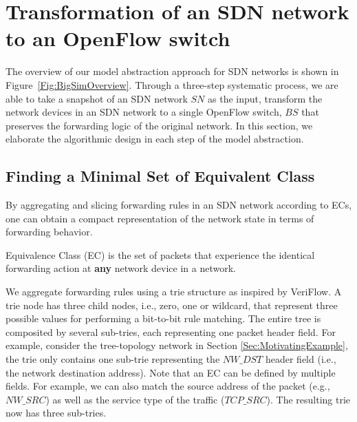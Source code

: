 \section{Transformation of an SDN network to an OpenFlow switch}
\label{Sec:Design}

The overview of our model abstraction approach for SDN networks is shown in Figure~\ref{Fig:BigSimOverview}. Through a three-step systematic process, we are able to take 
a snapshot of an SDN network $SN$ as the input, transform the network devices in an SDN network to a single OpenFlow switch, $BS$ that preserves the forwarding logic of the original network. In this section, we elaborate the algorithmic design in each step of the model abstraction.

\subsection{Finding a Minimal Set of Equivalent Class}
By aggregating and slicing forwarding rules in an SDN network according to ECs, one can obtain a compact representation of the network state in terms of forwarding behavior. 

\begin{definition}
Equivalence Class (EC) is the set of packets that experience the identical forwarding action at \textbf{any} network device in a network. 
\label{Def:EC}
\end{definition}


We aggregate forwarding rules using a trie structure as inspired by VeriFlow\cite{Veriflow}. 
A trie node has three child nodes, i.e., zero, one or wildcard, that represent three possible values for performing a bit-to-bit rule matching.
The entire tree is composited by several sub-tries, each representing one packet header field. For example, consider the tree-topology network in Section \ref{Sec:MotivatingExample}, the trie only contains one sub-trie representing the $NW\_DST$ header field (i.e., the network destination address). Note that an EC can be defined by multiple fields. For example, we can also match the source address of the packet (e.g., $NW\_SRC$) as well as the service type of the traffic ($TCP\_SRC$). The resulting trie now has three sub-tries.

